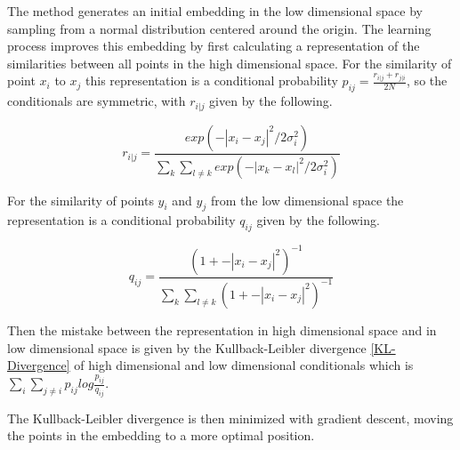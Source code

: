 The method generates an initial embedding in the low dimensional space by sampling from a normal distribution 
centered around the origin. The learning process improves this embedding by first calculating a 
representation of the similarities between all points in the high dimensional space. For the similarity of point
$x_{i}$ to $x_{j}$ this representation is a conditional probability $p_{ij}=\frac{r_{i|j} + r_{j|i}}{2N}$,
so the conditionals are symmetric, with 
$r_{i|j}$ given by the following.

\begin{equation} \label{pij}
    r_{i|j}=\frac{exp(-|x_{i}-x_{j}|^2/2\sigma_{i}^2)}{\sum_{k}\sum_{l\neq k} exp(-|x_{k}-x_{l}|^2/2\sigma_{i}^2)}
\end{equation}

For the similarity of points $y_{i}$ and $y_{j}$ from the low dimensional space the representation is a conditional
probability $q_{ij}$ given by the following.

\begin{equation} \label{qij}
    q_{ij}=\frac{(1 + -|x_{i}-x_{j}|^2)^{-1}}{\sum_{k}\sum_{l\neq k} (1 + -|x_{i}-x_{j}|^2)^{-1}}
\end{equation}

Then the mistake between the representation in high dimensional space and in low dimensional space is
given by the Kullback-Leibler divergence \ref{KL-Divergence} of high dimensional and low dimensional
conditionals which is $\sum_{i}\sum_{j\neq i}p_{ij}log \frac{p_{ij}}{q_{ij}}$.

The Kullback-Leibler divergence is then minimized with gradient descent, moving the points in the embedding to
a more optimal position.